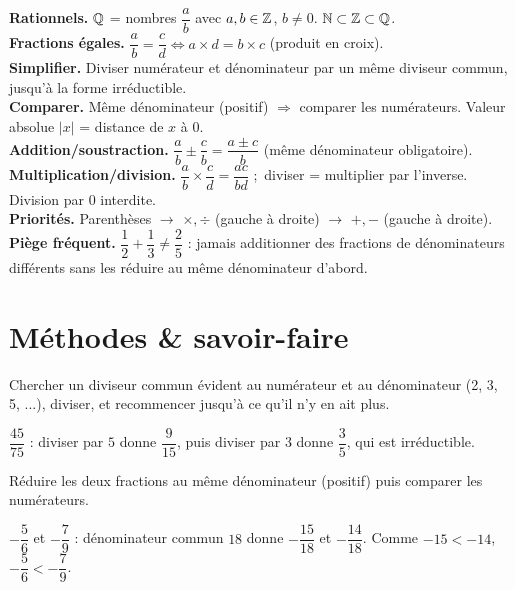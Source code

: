 \begin{synthese}
\textbf{Rationnels.} $\mathbb{Q}$ = nombres $\dfrac ab$ avec $a,b\in\mathbb{Z}$, $b\ne0$. $\mathbb{N}\subset\mathbb{Z}\subset\mathbb{Q}$.\\[4pt]
\textbf{Fractions égales.} $\dfrac ab=\dfrac cd\iff a\times d=b\times c$ (produit en croix).\\[4pt]
\textbf{Simplifier.} Diviser numérateur et dénominateur par un même diviseur commun, jusqu'à
la forme irréductible.\\[4pt]
\textbf{Comparer.} Même dénominateur (positif) $\Rightarrow$ comparer les numérateurs.
Valeur absolue $|x|$ = distance de $x$ à $0$.\\[4pt]
\textbf{Addition/soustraction.} $\dfrac ab\pm\dfrac cb=\dfrac{a\pm c}b$ (même dénominateur
obligatoire).\\[4pt]
\textbf{Multiplication/division.} $\dfrac ab\times\dfrac cd=\dfrac{ac}{bd}$ ;\ diviser =
multiplier par l'inverse. Division par $0$ interdite.\\[4pt]
\textbf{Priorités.} Parenthèses $\to$ $\times,\div$ (gauche à droite) $\to$ $+,-$ (gauche à
droite).\\[4pt]
\textbf{Piège fréquent.} $\dfrac12+\dfrac13\ne\dfrac25$ : jamais additionner des fractions de
dénominateurs différents sans les réduire au même dénominateur d'abord.
\end{synthese}

\section{Méthodes \& savoir-faire}

Chercher un diviseur commun évident au numérateur et au dénominateur (2, 3, 5, ...), diviser,
et recommencer jusqu'à ce qu'il n'y en ait plus.
\begin{exemple}
$\dfrac{45}{75}$ : diviser par $5$ donne $\dfrac9{15}$, puis diviser par $3$ donne
$\dfrac35$, qui est irréductible.
\end{exemple}

Réduire les deux fractions au même dénominateur (positif) puis comparer les numérateurs.
\begin{exemple}
$-\dfrac56$ et $-\dfrac79$ : dénominateur commun $18$ donne $-\dfrac{15}{18}$ et
$-\dfrac{14}{18}$. Comme $-15<-14$, $-\dfrac56<-\dfrac79$.
\end{exemple}

